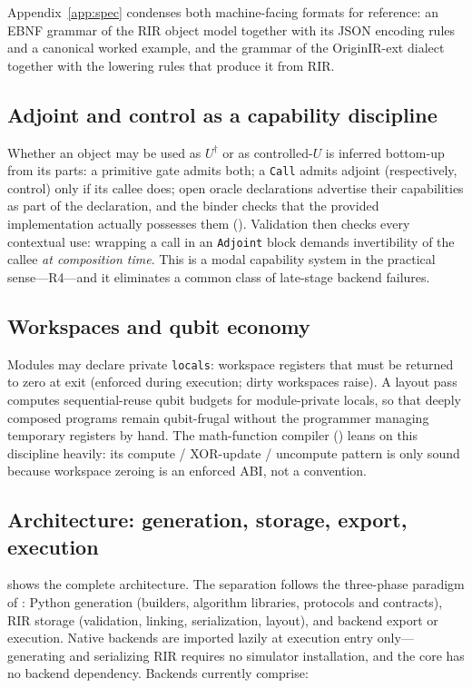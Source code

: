 Appendix~\ref{app:spec} condenses both machine-facing formats for
reference: an EBNF grammar of the RIR object model together with its JSON
encoding rules and a canonical worked example, and the grammar of the
OriginIR-ext dialect together with the lowering rules that produce it from
RIR.

\subsection{Adjoint and control as a capability discipline}
\label{sec:capabilities}

Whether an object may be used as $U^{\dagger}$ or as controlled-$U$ is
inferred bottom-up from its parts: a primitive gate admits both; a
\texttt{Call} admits adjoint (respectively, control) only if its callee does;
open oracle declarations advertise their capabilities as part of the
declaration, and the binder checks that the provided implementation actually
possesses them ().  Validation then checks every
contextual use: wrapping a call in an \texttt{Adjoint} block demands
invertibility of the callee \emph{at composition time}.  This is a modal
capability system in the practical sense---R4---and it eliminates a common
class of late-stage backend failures.

\subsection{Workspaces and qubit economy}
\label{sec:layout}

Modules may declare private \texttt{locals}: workspace registers that must be
returned to zero at exit (enforced during execution; dirty workspaces raise).
A layout pass computes sequential-reuse qubit budgets for module-private
locals, so that deeply composed programs remain qubit-frugal without the
programmer managing temporary registers by hand.  The math-function compiler
() leans on this discipline heavily: its compute /
XOR-update / uncompute pattern is only sound because workspace zeroing is an
enforced ABI, not a convention.

\subsection{Architecture: generation, storage, export, execution}
\label{sec:architecture}

 shows the complete architecture.  The separation
follows the three-phase paradigm of : Python
generation (builders, algorithm libraries, protocols and contracts), RIR
storage (validation, linking, serialization, layout), and backend export or
execution.  Native backends are imported lazily at execution entry
only---generating and serializing RIR requires no simulator installation, and
the core has no backend dependency.  Backends currently comprise:

